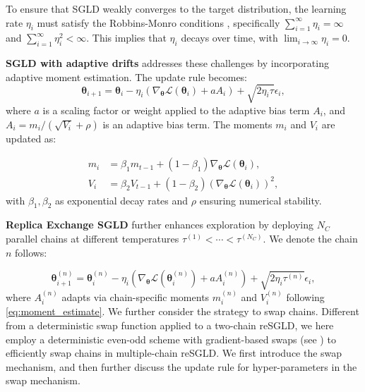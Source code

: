 \begin{remark}
    To ensure that SGLD weakly converges to the target distribution, the learning rate $\eta_i$ must satisfy the Robbins-Monro conditions \cite{welling2011bayesian,chen2014stochastic}, specifically $\sum_{i=1}^\infty \eta_i = \infty$ and $\sum_{i=1}^\infty \eta_i^2 < \infty$. This implies that $\eta_i$ decays over time, with $\lim_{i \to \infty} \eta_i = 0$. 
\end{remark}

\textbf{SGLD with adaptive drifts} addresses these challenges by incorporating adaptive moment estimation. The update rule becomes:
\begin{equation*}
{\boldsymbol{\theta}}_{i+1} = {\boldsymbol{\theta}}_i - \eta_i \left( \nabla_{\boldsymbol{\theta}} \mathcal{L}({\boldsymbol{\theta}}_i) + a A_i \right) + \sqrt{2 \eta_i \tau} \epsilon_{i},
\end{equation*}
where $a$ is a scaling factor or weight applied to the adaptive bias term $A_i$, and $A_i = m_i / (\sqrt{V_i} + \rho)$ is an adaptive bias term. The moments $m_i$ and $V_i$ are updated as:  

\begin{equation}\label{eq:moment_estimate}
\begin{aligned}
m_i &= \beta_1 m_{t-1} + (1 - \beta_1) \nabla_{\boldsymbol{\theta}} \mathcal{L}({\boldsymbol{\theta}}_i), \\
V_i &= \beta_2 V_{t-1} + (1 - \beta_2) \left(\nabla_{\boldsymbol{\theta}} \mathcal{L}({\boldsymbol{\theta}}_i)\right)^2,
\end{aligned}
\end{equation}
with $\beta_1, \beta_2$ as exponential decay rates and $\rho$ ensuring numerical stability. 


\textbf{Replica Exchange SGLD} further enhances exploration by deploying $N_C$ parallel chains at different temperatures $\tau^{(1)} < \cdots < \tau^{(N_C)}$. We denote the chain $n$ follows: 

\begin{equation}\label{eq:resgld}
    {\boldsymbol{\theta}}_{i+1}^{(n)} = {\boldsymbol{\theta}}_i^{(n)} - \eta_i \left( \nabla_{\boldsymbol{\theta}} \mathcal{L}({\boldsymbol{\theta}}_i^{(n)}) + a A_i^{(n)} \right) + \sqrt{2 \eta_i \tau^{(n)}} \epsilon_{i},
\end{equation}
where $A_i^{(n)}$ adapts via chain-specific moments $m_i^{(n)}$ and $V_i^{(n)}$ following \eqref{eq:moment_estimate}. We further consider the strategy to swap chains. Different from a deterministic swap function applied to a two-chain reSGLD, we here employ a deterministic even-odd scheme with gradient-based swaps (see \citep{deng2023non, zheng2024constrained}) to efficiently swap chains in multiple-chain reSGLD. We first introduce the swap mechanism, and then further discuss the update rule for hyper-parameters in the swap mechanism. 


